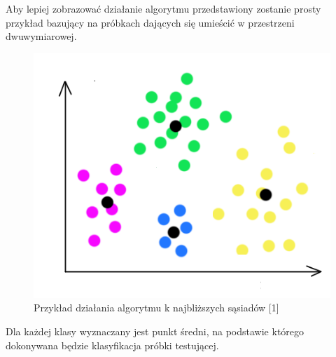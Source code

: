 \documentclass[12pt]{article}
\begin{document}
Aby lepiej zobrazować działanie algorytmu przedstawiony zostanie prosty przykład bazujący na próbkach dających się umieścić w przestrzeni dwuwymiarowej. \newline
\begin{figure}[H]
	\centering
		\includegraphics[scale=0.7]{images/nm_alg_example.png}
	\caption{Przykład działania algorytmu k najbliższych sąsiadów [1]}
\end{figure}

 
\indent Dla każdej klasy wyznaczany jest punkt średni, na podstawie którego dokonywana będzie klasyfikacja próbki testującej. 
\end{document}
